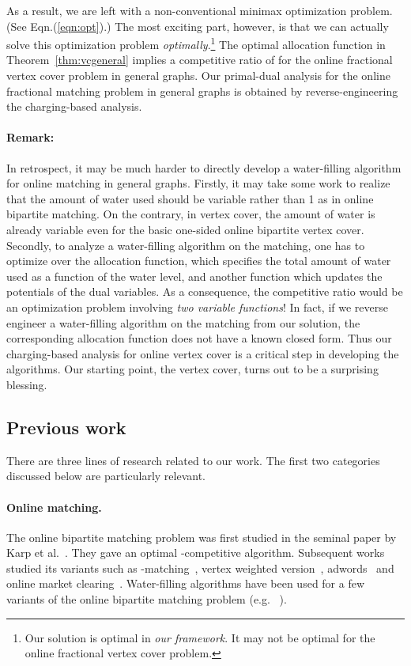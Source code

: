 \documentclass{article}
\begin{document}
As a result, we are left with a non-conventional minimax optimization problem. (See Eqn.(\ref{eqn:opt}).) The most exciting part, however, is that we can actually solve this optimization problem {\em optimally}.\footnote{Our solution is optimal in {\em our framework}. It may not be optimal for the online fractional vertex cover problem. } The optimal allocation function in Theorem~\ref{thm:vcgeneral} implies a competitive ratio of  for the online fractional vertex cover problem in general graphs.
Our primal-dual analysis for the online fractional matching problem in general graphs is obtained by reverse-engineering the charging-based analysis.

\paragraph{Remark:} In retrospect, it may be much harder to directly develop a water-filling algorithm for online matching in general graphs. 
Firstly, it may take some work to realize that the amount of water used should be variable rather than 1 as in online bipartite matching. On the contrary, in vertex cover, the amount of water is already variable even for the basic one-sided online bipartite vertex cover. Secondly, to analyze a water-filling algorithm on the matching, one has to optimize over the allocation function, which specifies the total amount of water used as a function of the water level, and another function which updates the potentials of the dual variables. As a consequence, the competitive ratio would be an optimization problem involving {\em two variable functions}! In fact, if we reverse engineer a water-filling algorithm on the matching from our solution, the corresponding allocation function does not have a known closed form.
Thus our charging-based analysis for online vertex cover is a critical step in developing the algorithms. Our starting point, the vertex cover, turns out to be a surprising blessing.

\subsection{Previous work}
There are three lines of research related to our work. The first two categories discussed below are particularly relevant.

\paragraph{Online matching.}
The online bipartite matching problem was first studied in the seminal paper by Karp et al.~\cite{Karp1990}. They gave an optimal -competitive algorithm. Subsequent works studied its variants such as -matching~\cite{kalyanasundaram2000optimal}, vertex weighted version~\cite{Aggarwal2011,devanurrandomized}, adwords~\cite{Buchbinder2007,DevenurH09,Mehta2007,devanurrandomized, devanur2012online,goel2008online,Aggarwal2011} and online market clearing~\cite{Blum2006}. Water-filling algorithms have been used for a few variants of the online bipartite matching problem (e.g. ~\cite{kalyanasundaram2000optimal,Buchbinder2007}).
\end{document}

